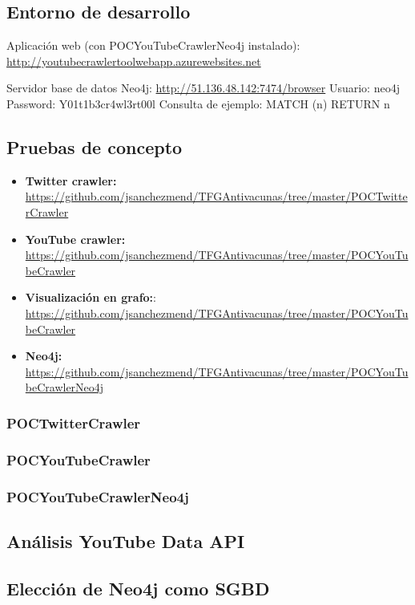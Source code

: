 \documentclass[11pt,a4paper]{article}
\begin{document}
\subsection{Entorno de desarrollo}
Aplicación web (con POCYouTubeCrawlerNeo4j instalado):
\url{http://youtubecrawlertoolwebapp.azurewebsites.net} 

Servidor base de datos Neo4j:
\url{http://51.136.48.142:7474/browser} 
Usuario: neo4j
Password: Y01t1b3cr4wl3rt00l
Consulta de ejemplo: MATCH (n) RETURN n
\medskip 

\subsection{Pruebas de concepto}
\begin{itemize}
\item \textbf{Twitter crawler:} \url{https://github.com/jsanchezmend/TFGAntivacunas/tree/master/POCTwitterCrawler}
\item \textbf{YouTube crawler:} \url{https://github.com/jsanchezmend/TFGAntivacunas/tree/master/POCYouTubeCrawler}
\item \textbf{Visualización en grafo:}: \url{https://github.com/jsanchezmend/TFGAntivacunas/tree/master/POCYouTubeCrawler}
\item \textbf{Neo4j:} \url{https://github.com/jsanchezmend/TFGAntivacunas/tree/master/POCYouTubeCrawlerNeo4j}
\end{itemize}
\medskip 

\subsubsection{POCTwitterCrawler}
\medskip 

\subsubsection{POCYouTubeCrawler}
\medskip 

\subsubsection{POCYouTubeCrawlerNeo4j}
\medskip 

\subsection{Análisis YouTube Data API}\label{youTubeDataAPI} 
\medskip 

\subsection{Elección de Neo4j como SGBD}
\medskip 
\end{document}
